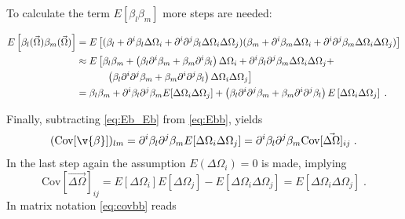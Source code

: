 To calculate the term $ {E}[{\beta_l}{\beta_m}] $ more steps are needed:

\begin{align}
E\left[\beta_l(\vec{\Omega})\beta_m(\vec{\Omega})\right]& = 
E\left[
	(
		\beta_l + \partial^i\beta_l\Delta\Omega_i + \partial^i\partial^j\beta_l\Delta\Omega_i\Delta\Omega_j
	)
	(
		\beta_m + \partial^i\beta_m\Delta\Omega_i + \partial^i\partial^j\beta_m\Delta\Omega_i\Delta\Omega_j
	)
\right] \notag \\
&\approx E\left[
	\beta_l\beta_m + 
	\left(\beta_l\partial^i\beta_m + \beta_m\partial^i\beta_l\right)\Delta\Omega_i +
	\partial^i\beta_l\partial^j\beta_m\Delta\Omega_i\Delta\Omega_j +\right. \notag\\ &\left.\quad\quad\quad
	\left(\beta_l\partial^i\partial^j\beta_m +\beta_m\partial^i\partial^j\beta_l\right)\Delta\Omega_i\Delta\Omega_j
\right] \notag\\
&= 	
	\beta_l\beta_m + 
	\partial^i\beta_l\partial^j\beta_mE[\Delta\Omega_i\Delta\Omega_j]+
	\left(\beta_l\partial^i\partial^j\beta_m +
	\beta_m\partial^i\partial^j\beta_l\right) E\left[\Delta\Omega_i\Delta\Omega_j \right]\;.
	\label{eq:Ebb}
\end{align} 

Finally, subtracting \eqref{eq:Eb_Eb} from \eqref{eq:Ebb}, yields
\begin{equation}
(\text{Cov}[\v{\beta}])_{lm} = \partial^i\beta_l\partial^j\beta_mE[\Delta\Omega_i\Delta\Omega_j] = \partial^i\beta_l\partial^j\beta_m \text{Cov}[\vec{\Delta\Omega}]_{ij}\;.
\label{eq:covbb}
\end{equation}
In the last step again the assumption $ E(\Delta\Omega_i)=0 $ is made, implying
\begin{equation}\label{key}
\text{Cov}[\vec{\Delta\Omega}]_{ij} =  E\left[\Delta\Omega_i \right] E[\Delta\Omega_j ] -  E\left[\Delta\Omega_i\Delta\Omega_j \right] =  E\left[\Delta\Omega_i\Delta\Omega_j \right]\;.
\end{equation}
In matrix notation \eqref{eq:covbb} reads

